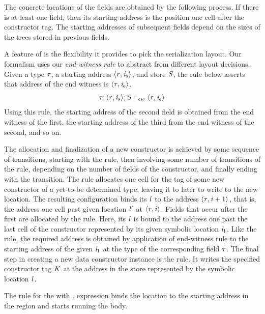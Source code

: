\documentclass[showabstract,showacknowledgments,showpreface,showdedication]{iuphd}
\theoremstyle{nonumberplain}
\begin{document}
The concrete locations of the fields are obtained by the following
process.
%
If there is at least one field, then its starting address is the
position one cell after the constructor tag.
%
The starting addresses of subsequent fields depend on the sizes of the
trees stored in previous fields.

A feature of \ourcalc{} is the flexibility it provides to pick the
serialization layout.
%
Our formalism uses our \emph{end-witness rule} to abstract from
different layout decisions.
%
Given a type $\mathit{\tau}$, a starting address
$\langle \mathit{r}, \mathit{i}_{s} \rangle ^{}$, and store $\mathit{S}$, the rule below
asserts that address of the end witness is
$\langle \mathit{r}, \mathit{i}_{e} \rangle ^{}$.
%
\begin{displaymath}
  \mathit{\tau};\langle \mathit{r}, \mathit{i}_{s} \rangle ^{};\mathit{S} \vdash_{ew} \langle \mathit{r}, \mathit{i}_{e} \rangle ^{}
\end{displaymath}
%
Using this rule, the starting address of the second field is obtained
from the end witness of the first, the starting address of the
third from the end witness of the second, and so on.

The allocation and finalization of a new constructor is achieved by
some sequence of transitions, starting with the \textsc{\dletloctag{}} rule, then
involving some number of transitions of the \textsc{\dletlocafter{}} rule,
depending on the number of fields of the constructor, and finally
ending with the \textsc{\ddatacon{}} transition.
%
The \textsc{\dletloctag{}} rule allocates one cell for the tag of some new
constructor of a yet-to-be determined type, leaving it to later to
write to the new location.
%
The resulting configuration binds its $\mathit{l}$ to the address
$\langle \mathit{r}, \mathit{i}+1 \rangle ^{}$, that is, the address one cell past
given location $\mathit{l}'$ at $\langle \mathit{r}, \mathit{i} \rangle ^{}$.
%
Fields that occur after the first are allocated by the
\textsc{\dletlocafter{}} rule.
%
Here, its $\mathit{l}$ is bound to the address  one
past the last cell of the constructor represented by its given
symbolic location $\mathit{l}_1$.
%
Like the \textsc{\dcase{}} rule, the required address is obtained by
application of end-witness rule to the starting address of the given
$\mathit{l}_1$ at the type of the corresponding field $\mathit{\tau}$.
%
The final step in creating a new data constructor instance
is the \textsc{\ddatacon{}} rule.
%
It writes the specified constructor tag $\mathit{K}$ at the address in the
store represented by the symbolic location $\mathit{l}$.

The \textsc{\dletlocstart{}} rule for the  with .
expression binds the location to the starting address in the region
and starts running the body.
\end{document}
